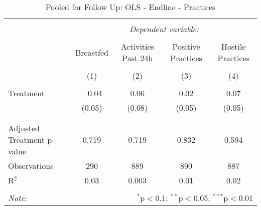 
\begin{table}[!htbp] \centering 
  \caption{Pooled for Follow Up: OLS - Endline - Practices} 
  \label{tbl:Pooled for Follow Up: OLS - Endline - Practices} 
\begin{tabular}{@{\extracolsep{5pt}}lcccc} 
\\[-1.8ex]\hline 
\hline \\[-1.8ex] 
 & \multicolumn{4}{c}{\textit{Dependent variable:}} \\ 
\cline{2-5} 
\\[-1.8ex] & Breastfed & Activities Past 24h & Positive Practices & Hostile Practices \\ 
\\[-1.8ex] & (1) & (2) & (3) & (4)\\ 
\hline \\[-1.8ex] 
 Treatment & $-$0.04 & 0.06 & 0.02 & 0.07 \\ 
  & (0.05) & (0.08) & (0.05) & (0.05) \\ 
  & & & & \\ 
\hline \\[-1.8ex] 
Adjusted Treatment p-value & 0.719 & 0.719 & 0.832 & 0.594 \\ 
Observations & 290 & 889 & 890 & 887 \\ 
R$^{2}$ & 0.03 & 0.003 & 0.01 & 0.02 \\ 
\hline 
\hline \\[-1.8ex] 
\textit{Note:}  & \multicolumn{4}{r}{$^{*}$p$<$0.1; $^{**}$p$<$0.05; $^{***}$p$<$0.01} \\ 
\end{tabular} 
\end{table} 
